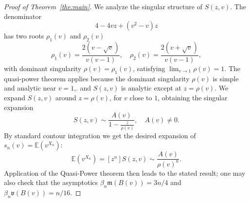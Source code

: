 \documentclass[10pt,a4paper]{amsart}
\def\E{{\mathbb {E}}}
\newcommand{\fm}{\ensuremath{\mathfrak{m}}}
\newcommand{\fv}{\ensuremath{\mathfrak{v}}}
\begin{document}
\begin{proof}[Proof of Theorem~\ref{the:main}]
We analyze the singular structure of $S(z,v)$. The denominator 
\[
4-4vz+(v^2-v)z
\]
has two roots $\rho_1(v)$ and $\rho_2(v)$
\[
\rho_1(v)=\frac{2(v-\sqrt{v})}{v(v-1)},
\quad \rho_2(v)=\frac{2(v+\sqrt{v})}{v(v-1)},
\]
with dominant singularity $\rho(v)=\rho_1(v)$, satisfying 
$\lim_{v\to 1} \rho(v)=1$. The quasi-power theorem applies because the dominant singularity $\rho(v)$ is simple and analytic near $v=1$,.
and $S(z,v)$ is analytic except at $z=\rho(v)$. We expand $S(z,v)$ around $z=\rho(v)$, for $v$ close to $1$, 
obtaining the singular expansion
\[
S(z,v)\sim \frac{A(v)}{1 - \frac{z}{\rho(v)}}, \quad A(v) \neq 0.
\]
By standard contour integration we get the desired expansion of $s_n(v)=\E(v^{X_n})$:
\[
\E(v^{X_n})=[z^n]S(z,v)\sim \frac{A(v)}{\rho(v)^n}.
\]
Application of the Quasi-Power theorem then leads to the stated result; one may also check that the asymptotics $\beta_n\fm(B(v))=3n/4$ and
$\beta_n\fv(B(v))=n/16$.
\end{proof}
\end{document}
